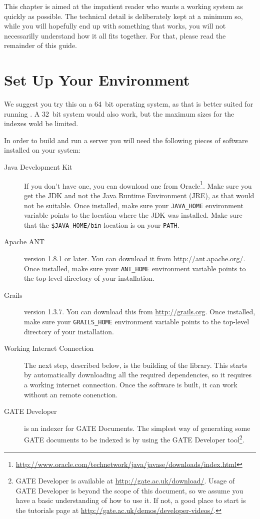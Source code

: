 This chapter is aimed at the impatient reader who wants a working system as
quickly as possible. The technical detail is deliberately kept at a minimum so,
while you will hopefully end up with something that works, you will not
necessarilly understand how it all fits together. For that, please read the
remainder of this guide.

\section{Set Up Your Environment}
We suggest you try this on a 64~bit operating system, as that is better suited
for running \Mimir{}. A 32~bit system would also work, but the maximum sizes for
the indexes wold be limited.

In order to build and run a \Mimir{} server you will need the following pieces
of software installed on your system:
\begin{description}
  \item[Java Development Kit] If you don't have one, you can download one from
  Oracle\footnote{\url{http://www.oracle.com/technetwork/java/javase/downloads/index.html}}.
  Make sure you get the JDK and not the Java Runtime Environment (JRE), as that
  would not be suitable. Once installed, make sure your \verb!JAVA_HOME!
  environment variable points to the location where the JDK was installed.  Make
  sure that the \verb!$JAVA_HOME/bin! location is on your \verb!PATH!.
  \item[Apache ANT] version 1.8.1 or later. You can download it from
  \url{http://ant.apache.org/}. Once installed, make sure your \verb!ANT_HOME!
  environment variable points to the top-level directory of your installation.
  \item[Grails] version 1.3.7. You can download this from
  \url{http://grails.org}. Once installed, make sure your \verb!GRAILS_HOME!
  environment variable points to the top-level directory of your installation.
  \item[Working Internet Connection] The next step, described below, is the
  building of the \Mimir{} library. This starts by automatically downloading all
  the required dependencies, so it requires a working internet connection. Once
  the software is built, it can work without an remote conenction.
  \item[GATE Developer] \Mimir{} is an indexer for GATE Documents. The simplest
  way of generating some GATE documents to be indexed is by using the GATE
  Developer tool\footnote{GATE Developer is available at
  \url{http://gate.ac.uk/download/}. Usage of GATE Developer is beyond the scope
  of this document, so we assume you have a basic understanding of how to use
  it. If not, a good place to start is the tutorials page at
  \url{http://gate.ac.uk/demos/developer-videos/}.}. 
\end{description}
%
